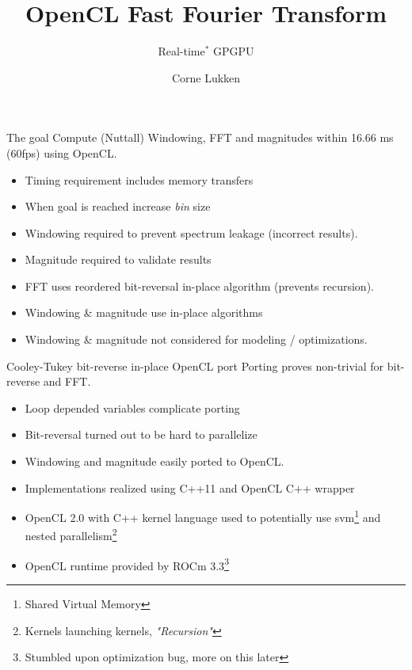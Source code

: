 \documentclass[aspectratio=169]{beamer}
\author{Corne Lukken}
\title{OpenCL Fast Fourier Transform}
\subtitle{Real-time$^*$ GPGPU}
\begin{document}

\frame{\titlepage}



\begin{frame}{The goal}
	\begingroup
	\small
	Compute (Nuttall) Windowing, FFT and magnitudes within 16.66 ms (60fps)
	using OpenCL.
	\begin{itemize}
		\item Timing requirement includes memory transfers
		\item When goal is reached increase \textit{bin} size
		\item Windowing required to prevent spectrum leakage
		(incorrect results).
		\item Magnitude required to validate results
		\item FFT uses reordered bit-reversal in-place algorithm
		(prevents recursion).
		\item Windowing \& magnitude use in-place algorithms
		\item Windowing \& magnitude not considered for modeling /
		optimizations.
	\end{itemize}
	\endgroup
\end{frame}

\begin{frame}{Cooley-Tukey bit-reverse in-place OpenCL port}
	\begingroup
	\small
	Porting proves non-trivial for bit-reverse and FFT.
	\begin{itemize}
		\item Loop depended variables complicate porting
		\item Bit-reversal turned out to be hard to parallelize
		\item Windowing and magnitude easily ported to OpenCL.
		\item Implementations realized using C++11 and OpenCL C++ wrapper
		\item OpenCL 2.0 with C++ kernel language used to potentially use
			svm\footnote{Shared Virtual Memory} and nested
			parallelism\footnote{Kernels launching kernels, \textit{"Recursion"}}
		\item OpenCL runtime provided by ROCm 3.3\footnote{Stumbled upon optimization bug, more on this later}
	\end{itemize}
	\endgroup
\end{frame}
\end{document}
